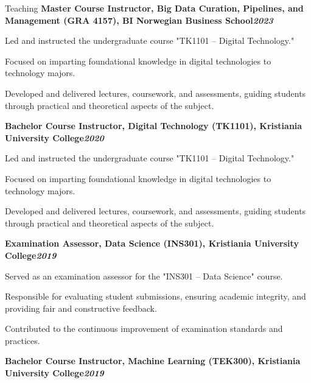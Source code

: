 \begin{rubric}{Teaching}
\entry*[]%
\textbf{Master Course Instructor, Big Data Curation, Pipelines, and Management (GRA 4157), BI Norwegian Business School\hfill\textit{2023}} \par
\begin{compactitem}
    \item Led and instructed the undergraduate course "TK1101 – Digital Technology."
    \item Focused on imparting foundational knowledge in digital technologies to technology majors.
    \item Developed and delivered lectures, coursework, and assessments, guiding students through practical and theoretical aspects of the subject.
    \vspace{-12pt}
\end{compactitem}
%
\entry*[]%
\textbf{Bachelor Course Instructor, Digital Technology (TK1101), Kristiania University College\hfill\textit{2020}} \par
\begin{compactitem}
    \item Led and instructed the undergraduate course "TK1101 – Digital Technology."
    \item Focused on imparting foundational knowledge in digital technologies to technology majors.
    \item Developed and delivered lectures, coursework, and assessments, guiding students through practical and theoretical aspects of the subject.
    \vspace{-12pt}
\end{compactitem}
%
\entry*[]%
\textbf{Examination Assessor, Data Science (INS301), Kristiania University College\hfill\textit{2019}} \par
\begin{compactitem}
    \item Served as an examination assessor for the "INS301 – Data Science" course.
    \item Responsible for evaluating student submissions, ensuring academic integrity, and providing fair and constructive feedback.
    \item Contributed to the continuous improvement of examination standards and practices.
    \vspace{-12pt}
\end{compactitem}
%
\entry*[]%
\textbf{Bachelor Course Instructor, Machine Learning (TEK300), Kristiania University College\hfill\textit{2019}} \par

\end{rubric}
